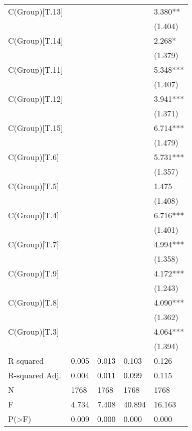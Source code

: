 \begin{tabular}{lllll}
C(Group)[T.13]  &            &            &             &     3.380** \\
                &            &            &             &     (1.404) \\
C(Group)[T.14]  &            &            &             &      2.268* \\
                &            &            &             &     (1.379) \\
C(Group)[T.11]  &            &            &             &    5.348*** \\
                &            &            &             &     (1.407) \\
C(Group)[T.12]  &            &            &             &    3.941*** \\
                &            &            &             &     (1.371) \\
C(Group)[T.15]  &            &            &             &    6.714*** \\
                &            &            &             &     (1.479) \\
C(Group)[T.6]   &            &            &             &    5.731*** \\
                &            &            &             &     (1.357) \\
C(Group)[T.5]   &            &            &             &       1.475 \\
                &            &            &             &     (1.408) \\
C(Group)[T.4]   &            &            &             &    6.716*** \\
                &            &            &             &     (1.401) \\
C(Group)[T.7]   &            &            &             &    4.994*** \\
                &            &            &             &     (1.358) \\
C(Group)[T.9]   &            &            &             &    4.172*** \\
                &            &            &             &     (1.243) \\
C(Group)[T.8]   &            &            &             &    4.090*** \\
                &            &            &             &     (1.362) \\
C(Group)[T.3]   &            &            &             &    4.064*** \\
                &            &            &             &     (1.394) \\
R-squared       &      0.005 &      0.013 &       0.103 &       0.126 \\
R-squared Adj.  &      0.004 &      0.011 &       0.099 &       0.115 \\
N               &       1768 &       1768 &        1768 &        1768 \\
F               &      4.734 &      7.408 &      40.894 &      16.163 \\
P(>F)           &      0.009 &      0.000 &       0.000 &       0.000 \\
\bottomrule
\end{tabular}
